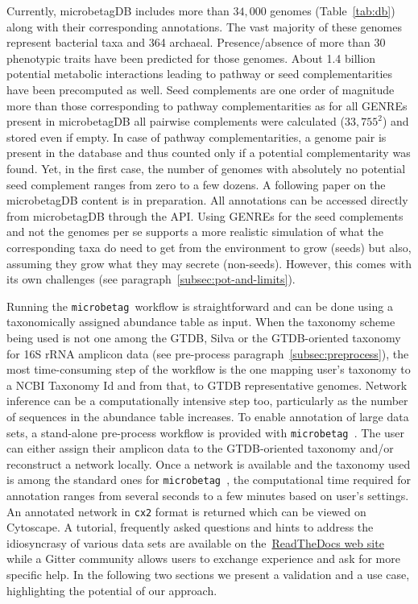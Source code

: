 \documentclass[sn-mathphys,Numbered]{sn-jnl}  %
\theoremstyle{thmstyleone}%
\theoremstyle{thmstyletwo}%
\theoremstyle{thmstylethree}%
\newcommand{\microbetag}{\texttt{microbetag }}
\begin{document}
        Currently, microbetagDB includes more than $34,000$ genomes (Table~\ref{tab:db}) along with their corresponding annotations.
        The vast majority of these genomes represent bacterial taxa and 364 archaeal.
        Presence/absence of more than 30 phenotypic traits have been predicted for those genomes.
        About 1.4 billion potential metabolic interactions leading to pathway or seed complementarities have been precomputed as well.
        Seed complements are one order of magnitude more than those corresponding to pathway complementarities as for all GENREs present in microbetagDB all pairwise complements were calculated ($33,755^2$) and stored even if empty.
        In case of pathway complementarities, a genome pair is present in the database and thus counted only if a potential complementarity was found.
        Yet, in the first case, the number of genomes with absolutely no potential seed complement ranges from zero to a few dozens.
        A following paper on the microbetagDB content is in preparation.
        All annotations can be accessed directly from microbetagDB through the API.
        Using GENREs for the seed complements and not the genomes per se supports a more realistic simulation of what the corresponding taxa do need to get from the environment to grow (seeds) but also, assuming they grow what they may secrete (non-seeds).
        However, this comes with its own challenges (see paragraph~\ref{subsec:pot-and-limits}). 

        Running the \microbetag workflow is straightforward and can be done using a taxonomically assigned abundance table as input.
        When the taxonomy scheme being used is not one among the GTDB, Silva or the GTDB-oriented taxonomy for 16S rRNA amplicon data (see pre-process paragraph~\ref{subsec:preprocess}), the most time-consuming step of the workflow is the one mapping user's taxonomy to a NCBI Taxonomy Id and from that, to GTDB representative genomes. 
        Network inference can be a computationally intensive step too, particularly as the number of sequences in the abundance table increases. 
        To enable annotation of large data sets, a stand-alone pre-process workflow is provided with \microbetag.
        The user can either assign their amplicon data to the GTDB-oriented taxonomy and/or reconstruct a network locally. 
        Once a network is available and the taxonomy used is among the standard ones for \microbetag, the computational time required for annotation ranges from several seconds to a few minutes based on user's settings.
        An annotated network in \texttt{cx2} format is returned which can be viewed on Cytoscape.
        A tutorial, frequently asked questions and hints to address the idiosyncrasy of various data sets are available on the~\href{https://hariszaf.github.io/microbetag/}{ReadTheDocs web site} while a Gitter community allows users to exchange experience and ask for more specific help.
        In the following two sections we present a validation and a use case, highlighting the potential of our approach.
\end{document}

